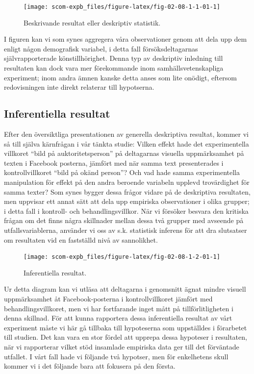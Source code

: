 \documentclass[
]{book}
\begin{document}
\begin{figure}

{\centering \texttt{[image: scom-expb\_files/figure-latex/fig-02-08-1-1-01-1]} 

}

\caption{Beskrivande resultat eller deskriptiv statistik.}\label{fig:fig-02-08-1-1-01}
\end{figure}

I figuren kan vi som synes aggregera våra observationer genom att dela upp dem enligt någon demografisk variabel, i detta fall försöksdeltagarnas självrapporterade könstillhörighet. Denna typ av deskriptiv inledning till resultaten kan dock vara mer förekommande inom samhällsvetenskapliga experiment; inom andra ämnen kanske detta anses som lite onödigt, eftersom redovisningen inte direkt relaterar till hypotserna.

\hypertarget{sub08.1.2}{%
\subsection{Inferentiella resultat}\label{sub08.1.2}}

Efter den översiktliga presentationen av generella deskriptiva resultat, kommer vi så till själva kärnfrågan i vår tänkta studie: Vilken effekt hade det experimentella villkoret ``bild på auktoritetsperson'' på deltagarnas visuella uppmärksamhet på texten i Facebook posterna, jämfört med när samma text presenterades i kontrollvillkoret ``bild på okänd person''? Och vad hade samma experimentella manipulation för effekt på den andra beroende variabeln upplevd trovärdighet för samma texter? Som synes bygger dessa frågor vidare på de deskriptiva resultaten, men uppvisar ett annat sätt att dela upp empiriska observationer i olika grupper; i detta fall i kontroll- och behandlingsvillkor. När vi försöker besvara den kritiska frågan om det finns några skillnader mellan dessa två grupper med avseende på utfallsvariablerna, använder vi oss av s.k. statistisk inferens för att dra slutsatser om resultaten vid en fastställd nivå av sannolikhet.

\begin{figure}

{\centering \texttt{[image: scom-expb\_files/figure-latex/fig-02-08-1-2-01-1]} 

}

\caption{Inferentiella resultat.}\label{fig:fig-02-08-1-2-01}
\end{figure}

Ur detta diagram kan vi utläsa att deltagarna i genomsnitt ägnat mindre visuell uppmärksamhet åt Facebook-posterna i kontrollvillkoret jämfört med behandlingsvillkoret, men vi har fortfarande inget mått på tillförlitligheten i denna skillnad. För att kunna rapportera dessa inferentiella resultat av vårt experiment måste vi här gå tillbaka till hypoteserna som uppställdes i förarbetet till studien. Det kan vara en stor fördel att upprepa dessa hypoteser i resultaten, när vi rapporterar vilket stöd insamlade empiriska data ger till det förväntade utfallet. I vårt fall hade vi följande två hypotser, men för enkelhetens skull kommer vi i det följande bara att fokusera på den första.
\end{document}
